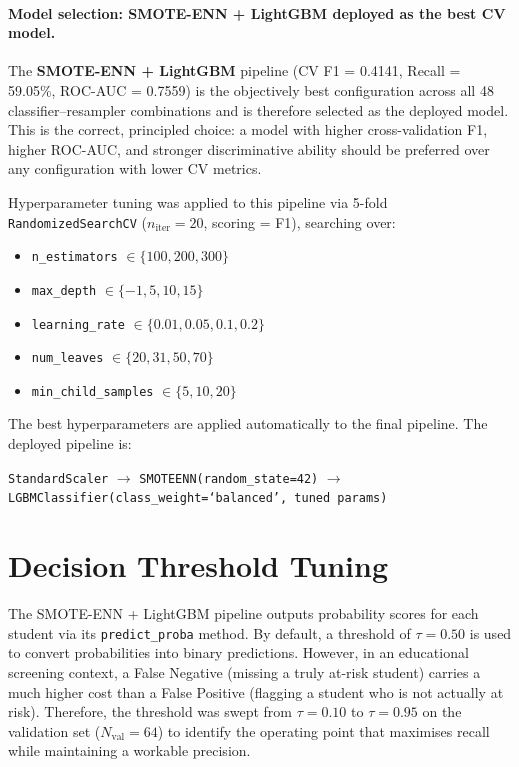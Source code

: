 \paragraph{Model selection: SMOTE-ENN + LightGBM deployed as the best CV model.}

The \textbf{SMOTE-ENN + LightGBM} pipeline (CV F1 = 0.4141, Recall = 59.05\%, ROC-AUC = 0.7559) is the objectively best configuration across all 48 classifier--resampler combinations and is therefore selected as the deployed model. This is the correct, principled choice: a model with higher cross-validation F1, higher ROC-AUC, and stronger discriminative ability should be preferred over any configuration with lower CV metrics.

Hyperparameter tuning was applied to this pipeline via 5-fold \texttt{RandomizedSearchCV} ($n_{\text{iter}} = 20$, scoring = F1), searching over:
\begin{itemize}
    \item \texttt{n\_estimators} $\in \{100, 200, 300\}$
    \item \texttt{max\_depth} $\in \{-1, 5, 10, 15\}$
    \item \texttt{learning\_rate} $\in \{0.01, 0.05, 0.1, 0.2\}$
    \item \texttt{num\_leaves} $\in \{20, 31, 50, 70\}$
    \item \texttt{min\_child\_samples} $\in \{5, 10, 20\}$
\end{itemize}

The best hyperparameters are applied automatically to the final pipeline. The deployed pipeline is:
\begin{center}
    \texttt{StandardScaler} $\rightarrow$ \texttt{SMOTEENN(random\_state=42)} $\rightarrow$ \texttt{LGBMClassifier(class\_weight=`balanced', tuned params)}
\end{center}

\section{Decision Threshold Tuning}
\label{sec:threshold_tuning_results}

The SMOTE-ENN + LightGBM pipeline outputs probability scores for each student via its \texttt{predict\_proba} method. By default, a threshold of $\tau = 0.50$ is used to convert probabilities into binary predictions. However, in an educational screening context, a False Negative (missing a truly at-risk student) carries a much higher cost than a False Positive (flagging a student who is not actually at risk). Therefore, the threshold was swept from $\tau = 0.10$ to $\tau = 0.95$ on the validation set ($N_{\text{val}} = 64$) to identify the operating point that maximises recall while maintaining a workable precision.

